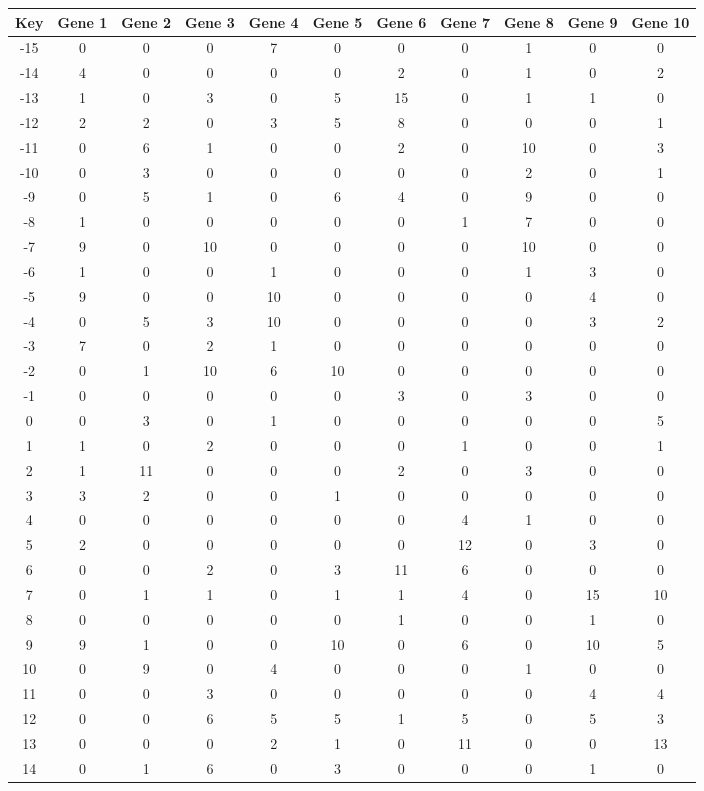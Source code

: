 \begin{tabular}{|c|c|c|c|c|c|c|c|c|c|c|}
\hline
Key & Gene 1 & Gene 2 & Gene 3 & Gene 4 & Gene 5 & Gene 6 & Gene 7 & Gene 8 & Gene 9 & Gene 10 \\
\hline
-15 & 0 & 0 & 0 & 7 & 0 & 0 & 0 & 1 & 0 & 0 \\
-14 & 4 & 0 & 0 & 0 & 0 & 2 & 0 & 1 & 0 & 2 \\
-13 & 1 & 0 & 3 & 0 & 5 & 15 & 0 & 1 & 1 & 0 \\
-12 & 2 & 2 & 0 & 3 & 5 & 8 & 0 & 0 & 0 & 1 \\
-11 & 0 & 6 & 1 & 0 & 0 & 2 & 0 & 10 & 0 & 3 \\
-10 & 0 & 3 & 0 & 0 & 0 & 0 & 0 & 2 & 0 & 1 \\
-9 & 0 & 5 & 1 & 0 & 6 & 4 & 0 & 9 & 0 & 0 \\
-8 & 1 & 0 & 0 & 0 & 0 & 0 & 1 & 7 & 0 & 0 \\
-7 & 9 & 0 & 10 & 0 & 0 & 0 & 0 & 10 & 0 & 0 \\
-6 & 1 & 0 & 0 & 1 & 0 & 0 & 0 & 1 & 3 & 0 \\
-5 & 9 & 0 & 0 & 10 & 0 & 0 & 0 & 0 & 4 & 0 \\
-4 & 0 & 5 & 3 & 10 & 0 & 0 & 0 & 0 & 3 & 2 \\
-3 & 7 & 0 & 2 & 1 & 0 & 0 & 0 & 0 & 0 & 0 \\
-2 & 0 & 1 & 10 & 6 & 10 & 0 & 0 & 0 & 0 & 0 \\
-1 & 0 & 0 & 0 & 0 & 0 & 3 & 0 & 3 & 0 & 0 \\
0 & 0 & 3 & 0 & 1 & 0 & 0 & 0 & 0 & 0 & 5 \\
1 & 1 & 0 & 2 & 0 & 0 & 0 & 1 & 0 & 0 & 1 \\
2 & 1 & 11 & 0 & 0 & 0 & 2 & 0 & 3 & 0 & 0 \\
3 & 3 & 2 & 0 & 0 & 1 & 0 & 0 & 0 & 0 & 0 \\
4 & 0 & 0 & 0 & 0 & 0 & 0 & 4 & 1 & 0 & 0 \\
5 & 2 & 0 & 0 & 0 & 0 & 0 & 12 & 0 & 3 & 0 \\
6 & 0 & 0 & 2 & 0 & 3 & 11 & 6 & 0 & 0 & 0 \\
7 & 0 & 1 & 1 & 0 & 1 & 1 & 4 & 0 & 15 & 10 \\
8 & 0 & 0 & 0 & 0 & 0 & 1 & 0 & 0 & 1 & 0 \\
9 & 9 & 1 & 0 & 0 & 10 & 0 & 6 & 0 & 10 & 5 \\
10 & 0 & 9 & 0 & 4 & 0 & 0 & 0 & 1 & 0 & 0 \\
11 & 0 & 0 & 3 & 0 & 0 & 0 & 0 & 0 & 4 & 4 \\
12 & 0 & 0 & 6 & 5 & 5 & 1 & 5 & 0 & 5 & 3 \\
13 & 0 & 0 & 0 & 2 & 1 & 0 & 11 & 0 & 0 & 13 \\
14 & 0 & 1 & 6 & 0 & 3 & 0 & 0 & 0 & 1 & 0 \\
\hline
\end{tabular}